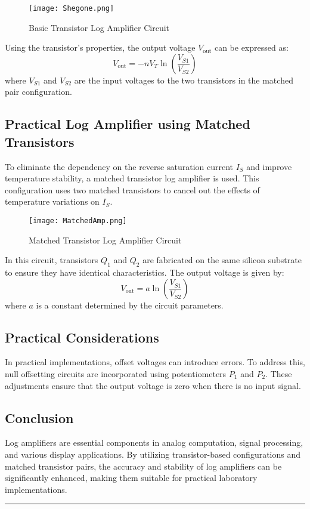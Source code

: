 \documentclass[a4paper,9pt,twoside,openany,twocolumn]{memoir}
\begin{document}
\begin{figure}[h]
    \centering
    \texttt{[image: Shegone.png]}
    \caption{Basic Transistor Log Amplifier Circuit}
    \label{fig:transistor_log_amp}
\end{figure}

Using the transistor's properties, the output voltage \(V_{\text{out}}\) can be expressed as:
\begin{equation}
V_{\text{out}} = -nV_T \ln\left(\frac{V_{S1}}{V_{S2}}\right)
\label{eq:transistor_log_amp}
\end{equation}
where \(V_{S1}\) and \(V_{S2}\) are the input voltages to the two transistors in the matched pair configuration.

\subsection{Practical Log Amplifier using Matched Transistors}
To eliminate the dependency on the reverse saturation current \(I_S\) and improve temperature stability, a matched transistor log amplifier is used. This configuration uses two matched transistors to cancel out the effects of temperature variations on \(I_S\).

\begin{figure}[h]
    \centering
    \texttt{[image: MatchedAmp.png]}
    \caption{Matched Transistor Log Amplifier Circuit}
    \label{fig:matched_transistor_log_amp}
\end{figure}

In this circuit, transistors \(Q_1\) and \(Q_2\) are fabricated on the same silicon substrate to ensure they have identical characteristics. The output voltage is given by:
\begin{equation}
V_{\text{out}} = a \ln\left(\frac{V_{S1}}{V_{S2}}\right)
\label{eq:matched_log_amp}
\end{equation}
where \(a\) is a constant determined by the circuit parameters.

\subsection{Practical Considerations}
In practical implementations, offset voltages can introduce errors. To address this, null offsetting circuits are incorporated using potentiometers \(P_1\) and \(P_2\). These adjustments ensure that the output voltage is zero when there is no input signal.

\subsection{Conclusion}
Log amplifiers are essential components in analog computation, signal processing, and various display applications. By utilizing transistor-based configurations and matched transistor pairs, the accuracy and stability of log amplifiers can be significantly enhanced, making them suitable for practical laboratory implementations.
\begin{center}\rule{0.5\linewidth}{0.5pt}\end{center}
\end{document}
